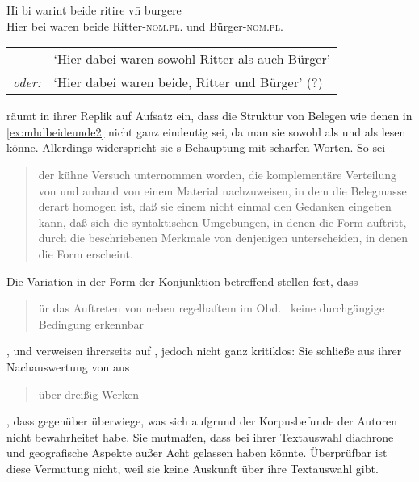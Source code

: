 \begin{exe}
\ex\label{ex:mhdbeideunde2}
	\gll Hi bi warint beide ritire vn̄ burgere \\
		Hier bei waren beide Ritter-\textsc{nom.pl.\MascI} und
			Bürger-\textsc{nom.pl.\MascA} \\
	\begin{taggedline}{\parencites(Rosheim, Dépt.~Bas-Rhin, 1286)[\pno~N~321, 245.29]{cao5}}
	\trans %
		\begin{tabular}{@{} r @{~} l @{}}
				  & `Hier dabei waren sowohl Ritter als auch Bürger' \\
			\emph{oder:} & `Hier dabei waren beide, Ritter und Bürger' (?)
			\\
		\end{tabular}
	\end{taggedline}
\end{exe}

\citet[187]{gjelsten1980} räumt in ihrer Replik auf 
Aufsatz ein, dass die Struktur von Belegen wie denen in \cref{ex:mhdbeideunde2}
nicht ganz eindeutig sei, da man sie sowohl als  und als
 lesen könne. Allerdings widerspricht sie
\citeauthor{askedal1974}s Behauptung mit scharfen Worten. So sei
\blockcquote[196]{gjelsten1980}{der kühne Versuch unternommen worden, die
komplementäre Verteilung von  und  anhand von einem
Material nachzuweisen, in dem die Belegmasse derart homogen ist, daß sie einem
nicht einmal den Gedanken eingeben kann, daß sich die syntaktischen Umgebungen,
in denen die Form  auftritt, durch die beschriebenen Merkmale von
denjenigen unterscheiden, in denen die Form  erscheint.}

Die Variation in der Form der Konjunktion betreffend stellen \citet[628]{ksw2}
fest, dass \blockquote{ür das Auftreten von  neben
regelhaftem  im Obd.\ \textelp{} keine durchgängige Bedingung
erkennbar }, und verweisen ihrerseits auf \citet{gjelsten1980},
jedoch nicht ganz kritiklos: Sie schließe aus ihrer Nachauswertung von
 aus
\blockcquote[198]{gjelsten1980}{über dreißig Werken}, dass 
gegenüber  überwiege, was sich aufgrund der Korpusbefunde der
Autoren nicht bewahrheitet habe. Sie mutmaßen, dass \citeauthor{gjelsten1980}
bei ihrer Textauswahl diachrone und geografische Aspekte außer Acht gelassen
haben könnte. Überprüfbar ist diese Vermutung nicht, weil sie keine Auskunft
über ihre Textauswahl gibt.

